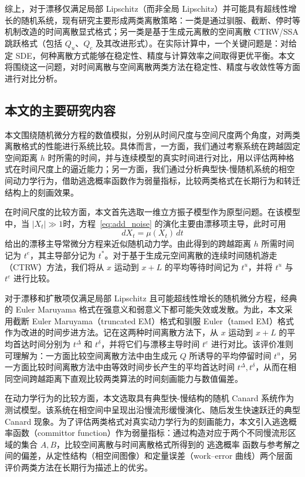 综上，对于漂移仅满足局部 Lipschitz（而非全局 Lipschitz）并可能具有超线性增长的随机系统，现有研究主要形成两类离散策略：一类是通过驯服、截断、停时等机制改造的时间离散显式格式；另一类是基于生成元离散的空间离散 CTRW/SSA 跳跃格式（包括 $Q_u$、$Q_c$ 及其改进形式）。在实际计算中，一个关键问题是：对给定 SDE，何种离散方式能够在稳定性、精度与计算效率之间取得更优平衡。本文将围绕这一问题，对时间离散与空间离散两类方法在稳定性、精度与收敛性等方面进行对比分析。



	\subsection{本文的主要研究内容}
	
	本文围绕随机微分方程的数值模拟，分别从时间尺度与空间尺度两个角度，对两类离散格式的性能进行系统比较。具体而言，一方面，我们通过考察系统在跨越固定空间距离 \(h\) 时所需的时间，并与连续模型的真实时间进行对比，用以评估两种格式在时间尺度上的逼近能力；另一方面，我们通过分析典型快-慢随机系统的相空间动力学行为，借助逃逸概率函数作为弱量指标，比较两类格式在长期行为和转迁结构上的刻画效果。
	
	在时间尺度的比较方面，本文首先选取一维立方振子模型作为原型问题。在该模型中，当 \(|X_t| \gg 1 \)时，方程~\eqref{eq:add_noise} 的演化主要由漂移项主导，此时可用
	\begin{equation}\label{drift dominated}
		d X_{t}=\mu\left(X_{t}\right)\, d t
	\end{equation}
	给出的漂移主导常微分方程来近似随机动力学。由此得到的跨越距离 \(h\) 所需时间记为 \(t^{e}\)，其主导部分记为 \(t^{*}\)。对于基于生成元空间离散的连续时间随机游走（CTRW）方法，我们将从 \(x\) 运动到 \(x+L\) 的平均等待时间记为 \(t^{u}\)，并将 \(t^{u}\) 与 \(t^{e}\) 进行比较。
	
	对于漂移和扩散项仅满足局部 Lipschitz 且可能超线性增长的随机微分方程，经典的 Euler Maruyama 格式在强意义和弱意义下都可能失效或发散。为此，本文采用截断 Euler Maruyama（truncated EM）格式和驯服 Euler（tamed EM）格式作为改进的时间步进方法。记在这两种时间离散方法下，从 \(x\) 运动到 \(x+L\) 的平均首达时间分别为 \(t^{\Delta}\) 和 \(t^{\delta}\)，并将它们与漂移主导时间 \(t^{e}\) 进行对比。该评价准则可理解为：一方面比较空间离散方法中由生成元 \(Q\) 所诱导的平均停留时间 \(t^{u}\)，另一方面比较时间离散方法中由等效时间步长产生的平均首达时间 \(t^{\Delta}, t^{\delta}\)，从而在相同空间跨越距离下直观比较两类算法的时间刻画能力与数值偏差。
	
	在动力学行为的比较方面，本文选取具有典型快-慢结构的随机 Canard 系统作为测试模型。该系统在相空间中呈现出沿慢流形缓慢演化、随后发生快速跃迁的典型 Canard 现象。为了评估两类格式对真实动力学行为的刻画能力，本文引入逃逸概率函数（committor function）作为弱量指标：通过构造对应于两个不同慢流形区域的集合 \(A,B\)，比较空间离散与时间离散格式所得到的 逃逸概率 函数与参考解之间的偏差，从定性结构（相空间图像）和定量误差（work--error 曲线）两个层面评价两类方法在长期行为描述上的优劣。
	
